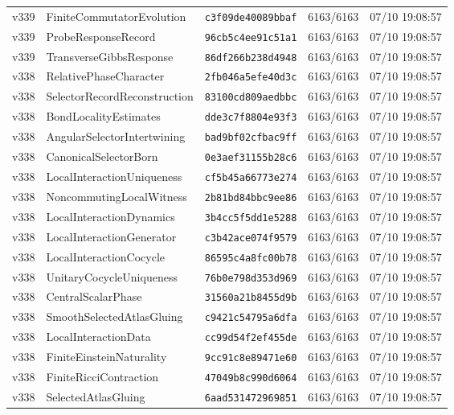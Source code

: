 \documentclass[11pt]{article}
\theoremstyle{definition}\newtheorem{deriv}{Derivação}
\begin{document}
{\begin{longtable}{@{}lllll@{}}
v339 & FiniteCommutatorEvolution & \texttt{c3f09de40089bbaf} & 6163/6163 & 07/10 19:08:57 \\
v339 & ProbeResponseRecord & \texttt{96cb5c4ee91c51a1} & 6163/6163 & 07/10 19:08:57 \\
v339 & TransverseGibbsResponse & \texttt{86df266b238d4948} & 6163/6163 & 07/10 19:08:57 \\
v338 & RelativePhaseCharacter & \texttt{2fb046a5efe40d3c} & 6163/6163 & 07/10 19:08:57 \\
v338 & SelectorRecordReconstruction & \texttt{83100cd809aedbbc} & 6163/6163 & 07/10 19:08:57 \\
v338 & BondLocalityEstimates & \texttt{dde3c7f8804e93f3} & 6163/6163 & 07/10 19:08:57 \\
v338 & AngularSelectorIntertwining & \texttt{bad9bf02cfbac9ff} & 6163/6163 & 07/10 19:08:57 \\
v338 & CanonicalSelectorBorn & \texttt{0e3aef31155b28c6} & 6163/6163 & 07/10 19:08:57 \\
v338 & LocalInteractionUniqueness & \texttt{cf5b45a66773e274} & 6163/6163 & 07/10 19:08:57 \\
v338 & NoncommutingLocalWitness & \texttt{2b81bd84bbc9ee86} & 6163/6163 & 07/10 19:08:57 \\
v338 & LocalInteractionDynamics & \texttt{3b4cc5f5dd1e5288} & 6163/6163 & 07/10 19:08:57 \\
v338 & LocalInteractionGenerator & \texttt{c3b42ace074f9579} & 6163/6163 & 07/10 19:08:57 \\
v338 & LocalInteractionCocycle & \texttt{86595c4a8fc00b78} & 6163/6163 & 07/10 19:08:57 \\
v338 & UnitaryCocycleUniqueness & \texttt{76b0e798d353d969} & 6163/6163 & 07/10 19:08:57 \\
v338 & CentralScalarPhase & \texttt{31560a21b8455d9b} & 6163/6163 & 07/10 19:08:57 \\
v338 & SmoothSelectedAtlasGluing & \texttt{c9421c54795a6dfa} & 6163/6163 & 07/10 19:08:57 \\
v338 & LocalInteractionData & \texttt{cc99d54f2ef455de} & 6163/6163 & 07/10 19:08:57 \\
v338 & FiniteEinsteinNaturality & \texttt{9cc91c8e89471e60} & 6163/6163 & 07/10 19:08:57 \\
v338 & FiniteRicciContraction & \texttt{47049b8c990d6064} & 6163/6163 & 07/10 19:08:57 \\
v338 & SelectedAtlasGluing & \texttt{6aad531472969851} & 6163/6163 & 07/10 19:08:57 \\

\end{longtable}}
\end{document}
